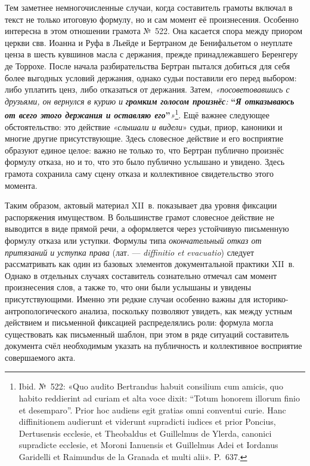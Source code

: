 Тем заметнее немногочисленные случаи, когда составитель грамоты включал в текст не только итоговую формулу, но и сам момент её произнесения. Особенно интересна в этом отношении грамота №~522. Она касается спора между приором церкви свв. Иоанна и Руфа в Льейде и Бертраном де Бенифальетом о неуплате ценза в шесть кувшинов масла с держания, прежде принадлежавшего Беренгеру де Торрохе. После начала разбирательства Бертран пытался добиться для себя более выгодных условий держания, однако судьи поставили его перед выбором: либо уплатить ценз, либо отказаться от держания. Затем, \emph{«посоветовавшись с друзьями, он вернулся в курию и }\textbf{\emph{громким голосом произнёс}}\emph{: }\textbf{“}\textbf{\emph{Я отказываюсь от всего этого держания и оставляю его}}\textbf{”}\emph{»}\footnote{Ibid. №~522: «Quo audito Bertrandus habuit consilium cum amicis, quo habito reddierint ad curiam et alta voce dixit: “Totum honorem illorum finio et desemparo”. Prior hoc audiens egit gratias omni conventui curie. Hanc diffinitionem audierunt et viderunt supradicti iudices et prior Poncius, Dertusensis ecclesie, et Theobaldus et Guillelmus de Ylerda, canonici supradicte ecclesie, et Moroni Ianuensis et Guillelmus Adei et Iordanus Garidelli et Raimundus de la Granada et multi alii». P.~637.}. Ещё важнее следующее обстоятельство: это действие \emph{«слышали и видели}» судьи, приор, каноники и многие другие присутствующие. Здесь словесное действие и его восприятие образуют единое целое: важно не только то, что Бертран публично произнёс формулу отказа, но и то, что это было публично услышано и увидено. Здесь грамота сохранила саму сцену отказа и коллективное свидетельство этого момента.

Таким образом, актовый материал XII~в. показывает два уровня фиксации распоряжения имуществом. В большинстве грамот словесное действие не выводится в виде прямой речи, а оформляется через устойчивую письменную формулу отказа или уступки. Формулы типа \emph{окончательный отказ от притязаний и уступка права} (лат. --- \emph{diffinitio et evacuatio}) следует рассматривать как один из базовых элементов документальной практики XII~в. Однако в отдельных случаях составитель сознательно отмечал сам момент произнесения слов, а также то, что они были услышаны и увидены присутствующими. Именно эти редкие случаи особенно важны для историко-антропологического анализа, поскольку позволяют увидеть, как между устным действием и письменной фиксацией распределялись роли: формула могла существовать как письменный шаблон, при этом в ряде ситуаций составитель документа счёл необходимым указать на публичность и коллективное восприятие совершаемого акта.


